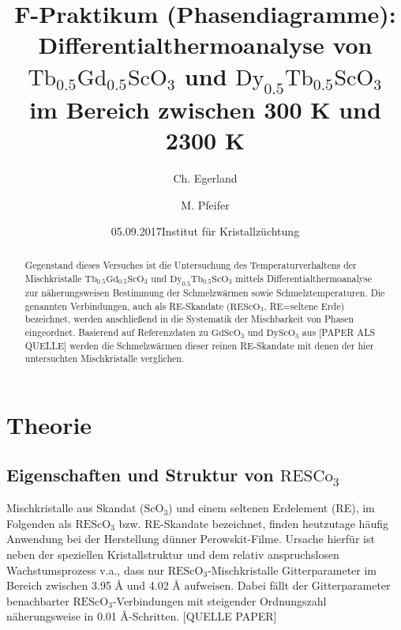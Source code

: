 \documentclass[aps,twocolumn,secnumarabic,nobalancelastpage,amsmath,amssymb,
nofootinbib,superscriptaddress]{revtex4-1}
\begin{document}
\title{F-Praktikum (Phasendiagramme):\\Differentialthermoanalyse von $\text{Tb}_{0.5}\text{Gd}_{0.5}\text{ScO}_3$
und $\text{Dy}_{0.5}\text{Tb}_{0.5}\text{ScO}_3$\\im Bereich zwischen 300 K und 2300 K}
\author         {Ch. Egerland}
\author         {M. Pfeifer}
\date[Versuchsdatum: ]{05.09.2017}
\date[Versuchsort: ]{Institut für Kristallzüchtung}

\begin{abstract}
Gegenstand dieses Versuches ist die Untersuchung des Temperaturverhaltens der Mischkristalle $\text{Tb}_{0.5}\text{Gd}_{0.5}\text{ScO}_3$ und
$\text{Dy}_{0.5}\text{Tb}_{0.5}\text{ScO}_3$ mittels Differentialthermoanalyse zur näherungsweisen Bestimmung der Schmelzwärmen sowie Schmelztemperaturen.
Die genannten Verbindungen, auch als RE-Skandate ($\text{REScO}_3$, RE=seltene Erde) bezeichnet, werden anschließend in die Systematik der Mischbarkeit von Phasen eingeordnet.
Basierend auf Referenzdaten zu $\text{Gd}\text{ScO}_3$ und $\text{Dy}\text{ScO}_3$ aus [PAPER ALS QUELLE] werden die Schmelzwärmen dieser reinen RE-Skandate mit denen der hier
untersuchten Mischkristalle verglichen.
\end{abstract}


\maketitle



\section{Theorie}
\subsection{Eigenschaften und Struktur von $\text{RESCo}_3$}
\noindent Mischkristalle aus Skandat ($\text{ScO}_3$) und einem seltenen Erdelement (RE), im Folgenden als $\text{REScO}_3$ bzw. RE-Skandate bezeichnet,
finden heutzutage häufig Anwendung bei der Herstellung dünner Perowskit-Filme. Ursache hierfür ist neben der speziellen Kristallstruktur und dem relativ
anspruchslosen Wachstumsprozess v.a., dass nur $\text{REScO}_3$-Mischkristalle Gitterparameter im Bereich zwischen 3.95 \AA$\text{ und}$ 4.02 \AA$\text{ aufweisen.}$
Dabei fällt der Gitterparameter benachbarter $\text{REScO}_3$-Verbindungen mit steigender Ordnungszahl näherungsweise in 0.01 \AA-Schritten. [QUELLE PAPER]
\end{document}
